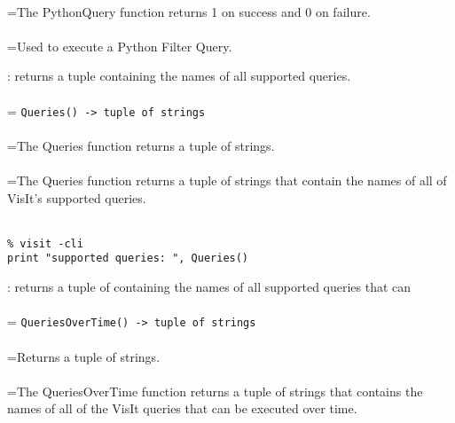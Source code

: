 \documentclass[10pt,a4paper]{report}
\begin{document}
 \\ 
\hangindent=\parindent The PythonQuery function returns 1 on success and 0 on failure. \\[-3mm] 

 \\ 
\hangindent=\parindent Used to execute a Python Filter Query. \\[-3mm] 

\newpage


{}
: returns a tuple containing the names of all supported queries.\\[-3mm]

 \\ 
\hangindent=\parindent 
\verb!Queries() -> tuple of strings!\\ [-3mm]

 \\ 
\hangindent=\parindent The Queries function returns a tuple of strings. \\[-3mm] 

 \\ 
\hangindent=\parindent The Queries function returns a tuple of strings that contain the names of all of VisIt's supported queries. \\[-3mm] 

\\[-6mm]
\begin{verbatim}% visit -cli
print "supported queries: ", Queries()
\end{verbatim}
\newpage


{}
: returns a tuple of containing the names of all supported queries that can\\[-3mm]

 \\ 
\hangindent=\parindent 
\verb!QueriesOverTime() -> tuple of strings!\\ [-3mm]

 \\ 
\hangindent=\parindent Returns a tuple of strings. \\[-3mm] 

 \\ 
\hangindent=\parindent The QueriesOverTime function returns a tuple of strings that contains the names of all of the VisIt queries that can be executed over time. \\[-3mm] 
\end{document}
